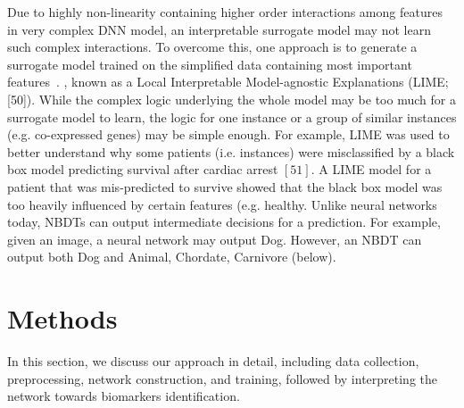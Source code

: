 \hspace*{3.5mm} Due to highly non-linearity containing higher order interactions among features in  very complex DNN model, an interpretable surrogate model may not learn such complex interactions. To overcome this, one approach is to generate a surrogate model trained on the simplified data containing most important features~\cite{molnar2019interpretable}.
, known as a Local Interpretable Model-agnostic Explanations (LIME; [50]). 
While the complex logic underlying the whole model may be too much for a surrogate model to learn, the logic for one instance or a group of similar instances (e.g. co-expressed genes) may be simple enough. For example, LIME was used to better understand why some patients (i.e. instances) were misclassified by a black box model predicting survival after cardiac arrest $[51] .$ A LIME model for a patient that was mis-predicted to survive showed that the black box model was too heavily influenced by certain features (e.g. healthy. Unlike neural networks today, NBDTs can output intermediate decisions for a prediction. For example, given an image, a neural network may output Dog. However, an NBDT can output both Dog and Animal, Chordate, Carnivore (below).

\section{Methods} \label{chapter_7:mm}
In this section, we discuss our approach in detail, including data collection, preprocessing, network construction, and training, followed by interpreting the network towards biomarkers identification. 

